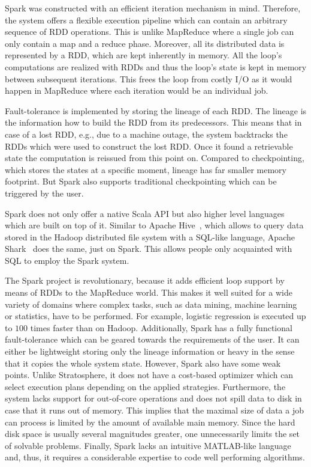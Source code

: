 Spark was constructed with an efficient iteration mechanism in mind.
Therefore, the system offers a flexible execution pipeline which can contain an arbitrary sequence of RDD operations.
This is unlike MapReduce where a single job can only contain a map and a reduce phase.
Moreover, all its distributed data is represented by a RDD, which are kept inherently in memory.
All the loop's computations are realized with RDDs and thus the loop's state is kept in memory between subsequent iterations.
This frees the loop from costly I/O as it would happen in MapReduce where each iteration would be an individual job.

Fault-tolerance is implemented by storing the lineage of each RDD.
The lineage is the information how to build the RDD from its predecessors.
This means that in case of a lost RDD, e.g., due to a machine outage, the system backtracks the RDDs which were used to construct the lost RDD.
Once it found a retrievable state the computation is reissued from this point on.
Compared to checkpointing, which stores the states at a specific moment, lineage has far smaller memory footprint.
But Spark also supports traditional checkpointing which can be triggered by the user.

Spark does not only offer a native Scala API but also higher level languages which are built on top of it.
Similar to Apache Hive~\cite{hive}, which allows to query data stored in the Hadoop distributed file system with a SQL-like language, Apache Shark~\cite{xin:2013a} does the same, just on Spark.
This allows people only acquainted with SQL to employ the Spark system.

The Spark project is revolutionary, because it adds efficient loop support by means of RDDs to the MapReduce world.
This makes it well suited for a wide variety of domains where complex tasks, such as data mining, machine learning or statistics, have to be performed.
For example, logistic regression is executed up to $100$ times faster than on Hadoop.
Additionally, Spark has a fully functional fault-tolerance which can be geared towards the requirements of the user.
It can either be lightweight storing only the lineage information or heavy in the sense that it copies the whole system state.
However, Spark also have some weak points.
Unlike Stratosphere, it does not have a cost-based optimizer which can select execution plans depending on the applied strategies.
Furthermore, the system lacks support for out-of-core operations and does not spill data to disk in case that it runs out of memory.
This implies that the maximal size of data a job can process is limited by the amount of available main memory.
Since the hard disk space is usually several magnitudes greater, one unnecessarily limits the set of solvable problems.
Finally, Spark lacks an intuitive MATLAB-like language and, thus, it requires a considerable expertise to code well performing algorithms.

